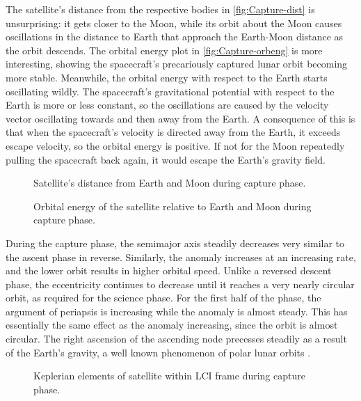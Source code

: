 The satellite's distance from the respective bodies in \autoref{fig:Capture-dist} is unsurprising: it gets closer to the Moon, while its orbit about the Moon causes oscillations in the distance to Earth that approach the Earth-Moon distance as the orbit descends. The orbital energy plot in \autoref{fig:Capture-orbeng} is more interesting, showing the spacecraft's precariously captured lunar orbit becoming more stable. Meanwhile, the orbital energy with respect to the Earth starts oscillating wildly. The spacecraft's gravitational potential with respect to the Earth is more or less constant, so the oscillations are caused by the velocity vector oscillating towards and then away from the Earth. A consequence of this is that when the spacecraft's velocity is directed away from the Earth, it exceeds escape velocity, so the orbital energy is positive. If not for the Moon repeatedly pulling the spacecraft back again, it would escape the Earth's gravity field.

\begin{figure}
\centering
\def\svgwidth{\figurewidth}

\caption{Satellite's distance from Earth and Moon during capture phase.}
\label{fig:Capture-dist}
\end{figure}

\begin{figure}
\centering
\def\svgwidth{\figurewidth}

\caption{Orbital energy of the satellite relative to Earth and Moon during capture phase.}
\label{fig:Capture-orbeng}
\end{figure}

During the capture phase, the semimajor axis steadily decreases very similar to the ascent phase in reverse. Similarly, the anomaly increases at an increasing rate, and the lower orbit results in higher orbital speed. Unlike a reversed descent phase, the eccentricity continues to decrease until it reaches a very nearly circular orbit, as required for the science phase. For the first half of the phase, the argument of periapsis is increasing while the anomaly is almost steady. This has essentially the same effect as the anomaly increasing, since the orbit is almost circular. The right ascension of the ascending node precesses steadily as a result of the Earth's gravity, a well known phenomenon of polar lunar orbits \parencite{Gupta2011}. %

\begin{figure}
\centering
\def\svgwidth{\figurewidth}

\caption{Keplerian elements of satellite within LCI frame during capture phase.}
\label{fig:Capture-kep-lci}
\end{figure}

